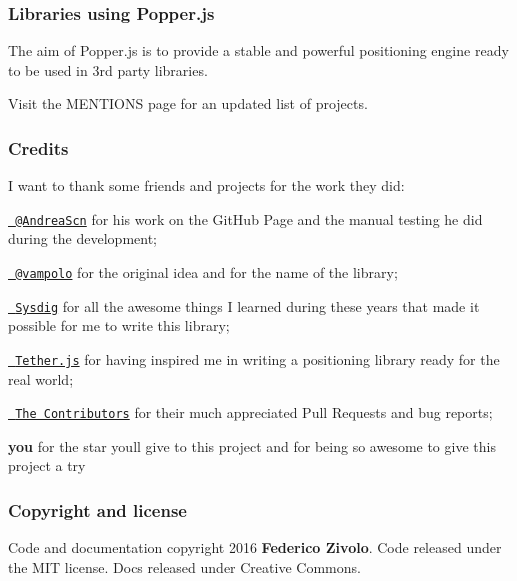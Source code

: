 \subsubsection*{Libraries using Popper.\+js}

The aim of Popper.\+js is to provide a stable and powerful positioning engine ready to be used in 3rd party libraries.

Visit the M\+E\+N\+T\+I\+O\+NS page for an updated list of projects.

\subsubsection*{Credits}

I want to thank some friends and projects for the work they did\+:


\begin{DoxyItemize}
\item \href{https://github.com/AndreaScn}{\texttt{ @\+Andrea\+Scn}} for his work on the Git\+Hub Page and the manual testing he did during the development;
\item \href{https://github.com/vampolo}{\texttt{ @vampolo}} for the original idea and for the name of the library;
\item \href{https://github.com/Draios}{\texttt{ Sysdig}} for all the awesome things I learned during these years that made it possible for me to write this library;
\item \href{http://github.hubspot.com/tether/}{\texttt{ Tether.\+js}} for having inspired me in writing a positioning library ready for the real world;
\item \href{https://github.com/FezVrasta/popper.js/graphs/contributors}{\texttt{ The Contributors}} for their much appreciated Pull Requests and bug reports;
\item {\bfseries{you}} for the star you\textquotesingle{}ll give to this project and for being so awesome to give this project a try 🙂
\end{DoxyItemize}

\subsubsection*{Copyright and license}

Code and documentation copyright 2016 {\bfseries{Federico Zivolo}}. Code released under the M\+IT license. Docs released under Creative Commons. 
